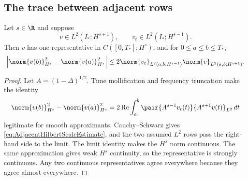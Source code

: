 \subsection{The trace between adjacent rows}

\begin{lemma}\label{lem:AdjacentHilbertScaleTrace}
Let \(s\in\R\) and suppose
\[
  v\in L^2(I_*;H^{s+1}),
  \qquad
  v_t\in L^2(I_*;H^{s-1}).
\]
Then \(v\) has one representative in \(C([0,T_*];H^s)\), and for
\(0\leq a\leq b\leq T_*\),
\begin{equation}\label{eq:AdjacentHilbertScaleEstimate}
  \left|
  \norm{v(b)}_{H^s}^{2}
  -\norm{v(a)}_{H^s}^{2}
  \right|
  \leq
  2\norm{v_t}_{L^2(a,b;H^{s-1})}
  \norm{v}_{L^2(a,b;H^{s+1})}.
\end{equation}
\end{lemma}

\begin{proof}
Let \(A=(1-\Delta)^{1/2}\).  Time mollification and frequency truncation make
the identity
\begin{equation}\label{eq:AdjacentHilbertScaleIdentity}
  \norm{v(b)}_{H^s}^{2}
  -\norm{v(a)}_{H^s}^{2}
  =
  2\operatorname{Re}\int_a^b
  \pair{A^{s-1}v_t(t)}{A^{s+1}v(t)}_{L^2}
  \,dt
\end{equation}
legitimate for smooth approximants.  Cauchy--Schwarz gives
\eqref{eq:AdjacentHilbertScaleEstimate}, and the two assumed \(L^2\) rows
pass the right-hand side to the limit.  The limit identity makes the
\(H^s\) norm continuous.  The same approximation gives weak \(H^s\)
continuity, so the representative is strongly continuous.  Any two
continuous representatives agree everywhere because they agree almost
everywhere.
\end{proof}
